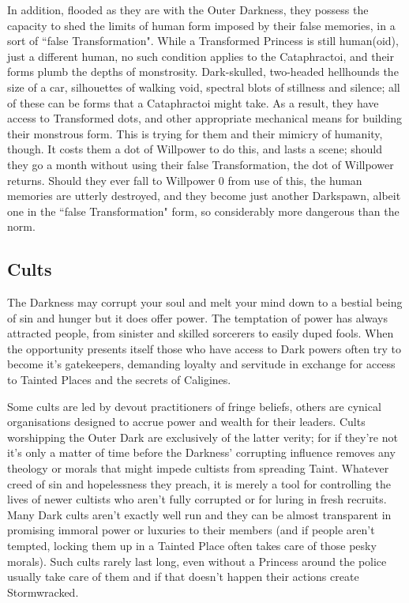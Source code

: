 In addition, flooded as they are with the Outer Darkness, they possess the capacity to shed the limits of human form imposed by their false memories, in a sort of \textquotedblleft false Transformation". While a Transformed Princess is still human(oid), just a different human, no such condition applies to the Cataphractoi, and their forms plumb the depths of monstrosity. Dark-skulled, two-headed hellhounds the size of a car, silhouettes of walking void, spectral blots of stillness and silence; all of these can be forms that a Cataphractoi might take. As a result, they have access to Transformed dots, and other appropriate mechanical means for building their monstrous form. This is trying for them and their mimicry of humanity, though. It costs them a dot of Willpower to do this, and lasts a scene; should they go a month without using their false Transformation, the dot of Willpower returns. Should they ever fall to Willpower 0 from use of this, the human memories are utterly destroyed, and they become just 
another Darkspawn, albeit one in the \textquotedblleft false Transformation" form, so considerably more dangerous than the norm. 

\subsection*{Cults}

The Darkness may corrupt your soul and melt your mind down to a bestial being of sin and hunger but it does offer power. The temptation of power has always attracted people, from sinister and skilled sorcerers to easily duped fools. When the opportunity presents itself those who have access to Dark powers often try to become it's gatekeepers, demanding loyalty and servitude in exchange for access to Tainted Places and the secrets of Caligines.

Some cults are led by devout practitioners of fringe beliefs, others are cynical organisations designed to accrue power and wealth for their leaders. Cults worshipping the Outer Dark are exclusively of the latter verity; for if they're not it's only a matter of time before the Darkness' corrupting influence removes any theology or morals that might impede cultists from spreading Taint. Whatever creed of sin and hopelessness they preach, it is merely a tool for controlling the lives of newer cultists who aren't fully corrupted or for luring in fresh recruits. Many Dark cults aren't exactly well run and they can be almost transparent in promising immoral power or luxuries to their members (and if people aren't tempted, locking them up in a Tainted Place often takes care of those pesky morals). Such cults rarely last long, even without a Princess around the police usually take care of them and if that doesn’t happen their actions create Stormwracked. 

